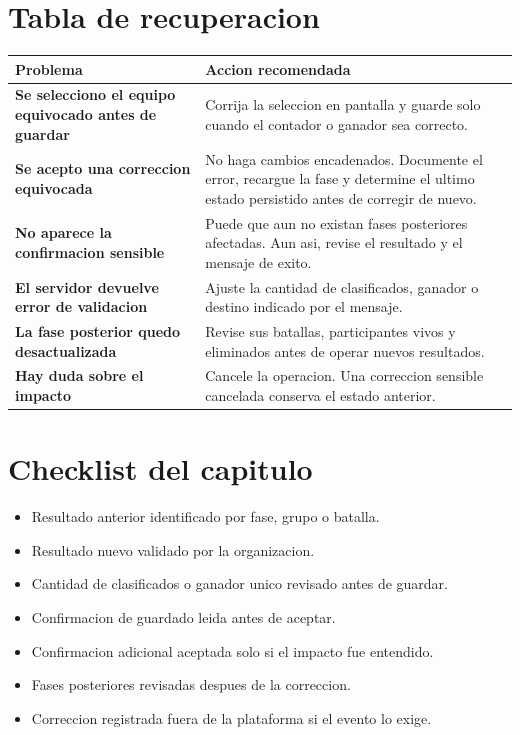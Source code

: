 \section{Tabla de recuperacion}

\begin{tabularx}{\linewidth}{>{\bfseries}p{4.2cm}X}
\toprule
Problema & Accion recomendada\\
\midrule
Se selecciono el equipo equivocado antes de guardar & Corrija la seleccion en pantalla y guarde solo cuando el contador o ganador sea correcto.\\
Se acepto una correccion equivocada & No haga cambios encadenados. Documente el error, recargue la fase y determine el ultimo estado persistido antes de corregir de nuevo.\\
No aparece la confirmacion sensible & Puede que aun no existan fases posteriores afectadas. Aun asi, revise el resultado y el mensaje de exito.\\
El servidor devuelve error de validacion & Ajuste la cantidad de clasificados, ganador o destino indicado por el mensaje.\\
La fase posterior quedo desactualizada & Revise sus batallas, participantes vivos y eliminados antes de operar nuevos resultados.\\
Hay duda sobre el impacto & Cancele la operacion. Una correccion sensible cancelada conserva el estado anterior.\\
\bottomrule
\end{tabularx}

\section{Checklist del capitulo}

\begin{itemize}
    \item Resultado anterior identificado por fase, grupo o batalla.
    \item Resultado nuevo validado por la organizacion.
    \item Cantidad de clasificados o ganador unico revisado antes de guardar.
    \item Confirmacion de guardado leida antes de aceptar.
    \item Confirmacion adicional aceptada solo si el impacto fue entendido.
    \item Fases posteriores revisadas despues de la correccion.
    \item Correccion registrada fuera de la plataforma si el evento lo exige.
\end{itemize}
